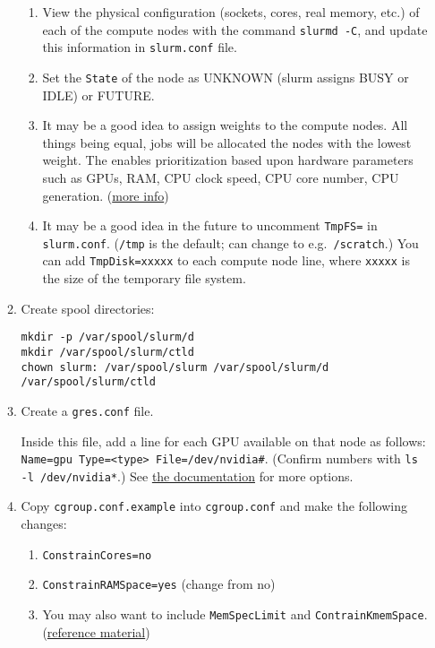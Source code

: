 \begin{enumerate}
\begin{enumerate}
\begin{enumerate}
		\item View the physical configuration (sockets, cores, real memory, etc.) of each of the compute nodes with the command \texttt{slurmd -C}, and update this information in \texttt{slurm.conf} file.

		\item Set the \texttt{State} of the node as UNKNOWN (slurm assigns BUSY or IDLE) or FUTURE.

		\item It may be a good idea to assign weights to the compute nodes. All things being equal, jobs will be allocated the nodes with the lowest weight. The enables prioritization based upon hardware parameters such as GPUs, RAM, CPU clock speed, CPU core number, CPU generation. (\href{https://wiki.fysik.dtu.dk/niflheim/Slurm_configuration#node-weight}{more info})

		\item It may be a good idea in the future to uncomment \texttt{TmpFS=} in \texttt{slurm.conf}. (\texttt{/tmp} is the default; can change to e.g.\ \texttt{/scratch}.) You can add \texttt{TmpDisk=xxxxx} to each compute node line, where \texttt{xxxxx} is the size of the temporary file system.

		\end{enumerate}

	\item Create spool directories:
	
	\texttt{mkdir -p /var/spool/slurm/d} \\
	\texttt{mkdir /var/spool/slurm/ctld} \\
	\texttt{chown slurm: /var/spool/slurm /var/spool/slurm/d /var/spool/slurm/ctld}
	
	\item Create a \texttt{gres.conf} file. 

	Inside this file, add a line for each GPU available on that node as follows: \texttt{Name=gpu Type=<type> File=/dev/nvidia\#}. (Confirm numbers with \texttt{ls -l /dev/nvidia*}.) See \href{https://slurm.schedmd.com/gres.conf.html}{the documentation} for more options.

	\item Copy \texttt{cgroup.conf.example} into \texttt{cgroup.conf} and make the following changes:

		\begin{enumerate}
		\item \texttt{ConstrainCores=no}
		\item \texttt{ConstrainRAMSpace=yes} (change from no)
		\item You may also want to include \texttt{MemSpecLimit} and \texttt{ContrainKmemSpace}.  (\href{https://www.mankier.com/5/cgroup.conf}{reference material})
		\end{enumerate}
		

\end{enumerate}
\end{enumerate}
